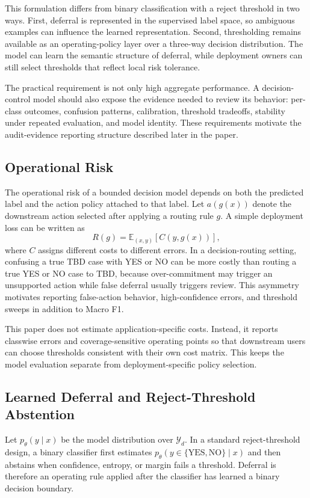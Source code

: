 \documentclass[11pt]{article}
\begin{document}
This formulation differs from binary classification with a reject threshold in two ways. First, deferral is represented in the supervised label space, so ambiguous examples can influence the learned representation. Second, thresholding remains available as an operating-policy layer over a three-way decision distribution. The model can learn the semantic structure of deferral, while deployment owners can still select thresholds that reflect local risk tolerance.

The practical requirement is not only high aggregate performance. A decision-control model should also expose the evidence needed to review its behavior: per-class outcomes, confusion patterns, calibration, threshold tradeoffs, stability under repeated evaluation, and model identity. These requirements motivate the audit-evidence reporting structure described later in the paper.

\subsection{Operational Risk}

The operational risk of a bounded decision model depends on both the predicted label and the action policy attached to that label. Let $a(g(x))$ denote the downstream action selected after applying a routing rule $g$. A simple deployment loss can be written as
\[
R(g) = \mathbb{E}_{(x,y)} \left[ C(y, g(x)) \right],
\]
where $C$ assigns different costs to different errors. In a decision-routing setting, confusing a true TBD case with YES or NO can be more costly than routing a true YES or NO case to TBD, because over-commitment may trigger an unsupported action while false deferral usually triggers review. This asymmetry motivates reporting false-action behavior, high-confidence errors, and threshold sweeps in addition to Macro F1.

This paper does not estimate application-specific costs. Instead, it reports classwise errors and coverage-sensitive operating points so that downstream users can choose thresholds consistent with their own cost matrix. This keeps the model evaluation separate from deployment-specific policy selection.

\subsection{Learned Deferral and Reject-Threshold Abstention}

Let $p_\theta(y \mid x)$ be the model distribution over $\mathcal{Y}_d$. In a standard reject-threshold design, a binary classifier first estimates $p_\theta(y \in \{\text{YES}, \text{NO}\}\mid x)$ and then abstains when confidence, entropy, or margin fails a threshold. Deferral is therefore an operating rule applied after the classifier has learned a binary decision boundary.
\end{document}
